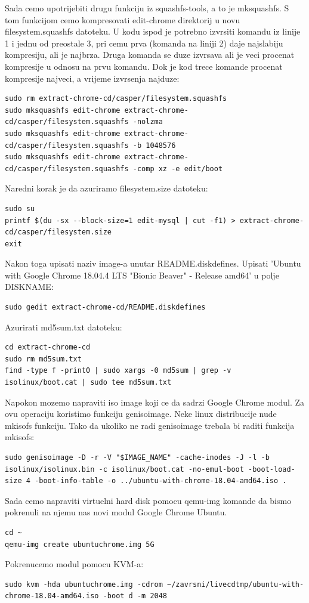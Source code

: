 \documentclass[12pt,vi]{mitthesis}
\begin{document}
\noindent
Sada cemo upotrijebiti drugu funkciju iz squashfs-tools, a to je mksquashfs. S tom funkcijom cemo kompresovati edit-chrome direktorij u novu filesystem.squashfs datoteku. U kodu ispod je potrebno izvrsiti komandu iz linije 1 i jednu od preostale 3, pri cemu prva (komanda na liniji 2) daje najslabiju kompresiju, ali je najbrza. Druga komanda se duze izvrsava ali je veci procenat kompresije u odnosu na prvu komandu. Dok je kod trece komande procenat kompresije najveci, a vrijeme izvrsenja najduze:
\begin{lstlisting}[style=BashInputStyle]
sudo rm extract-chrome-cd/casper/filesystem.squashfs
sudo mksquashfs edit-chrome extract-chrome-cd/casper/filesystem.squashfs -nolzma 
sudo mksquashfs edit-chrome extract-chrome-cd/casper/filesystem.squashfs -b 1048576
sudo mksquashfs edit-chrome extract-chrome-cd/casper/filesystem.squashfs -comp xz -e edit/boot
\end{lstlisting}

\noindent
Naredni korak je da azuriramo filesystem.size datoteku:
\begin{lstlisting}[style=BashInputStyle]
sudo su
printf $(du -sx --block-size=1 edit-mysql | cut -f1) > extract-chrome-cd/casper/filesystem.size
exit
\end{lstlisting}

\noindent
Nakon toga upisati naziv image-a unutar README.diskdefines. 
Upisati 'Ubuntu with Google Chrome 18.04.4 LTS "Bionic Beaver" - Release amd64' u polje DISKNAME:
\begin{lstlisting}[style=BashInputStyle]
sudo gedit extract-chrome-cd/README.diskdefines
\end{lstlisting}

\noindent
Azurirati md5sum.txt datoteku:
\begin{lstlisting}[style=BashInputStyle]
cd extract-chrome-cd
sudo rm md5sum.txt
find -type f -print0 | sudo xargs -0 md5sum | grep -v isolinux/boot.cat | sudo tee md5sum.txt
\end{lstlisting}

\noindent
Napokon mozemo napraviti iso image koji ce da sadrzi Google Chrome modul. Za ovu operaciju koristimo funkciju genisoimage. Neke linux distribucije nude mkisofs funkciju. Tako da ukoliko ne radi genisoimage trebala bi raditi funkcija mkisofs:
\begin{lstlisting}[style=BashInputStyle]
sudo genisoimage -D -r -V "$IMAGE_NAME" -cache-inodes -J -l -b isolinux/isolinux.bin -c isolinux/boot.cat -no-emul-boot -boot-load-size 4 -boot-info-table -o ../ubuntu-with-chrome-18.04-amd64.iso .
\end{lstlisting}

\noindent
Sada cemo napraviti virtuelni hard disk pomocu qemu-img komande da bismo pokrenuli na njemu nas novi modul Google Chrome Ubuntu.
\begin{lstlisting}[style=BashInputStyle]
cd ~
qemu-img create ubuntuchrome.img 5G
\end{lstlisting}

\noindent 
Pokrenucemo modul pomocu KVM-a:
\begin{lstlisting}[style=BashInputStyle]
sudo kvm -hda ubuntuchrome.img -cdrom ~/zavrsni/livecdtmp/ubuntu-with-chrome-18.04-amd64.iso -boot d -m 2048
\end{lstlisting}
\end{document}
